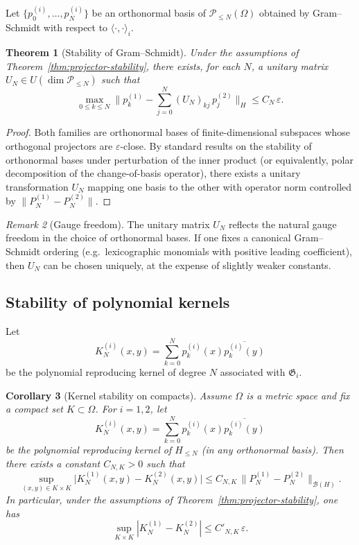 \documentclass{amsart}
\numberwithin{equation}{section}
\newtheorem{theorem}{Theorem}[section]
\newtheorem{corollary}[theorem]{Corollary}
\theoremstyle{definition}
\theoremstyle{remark}
\newtheorem{remark}[theorem]{Remark}
\begin{document}
Let $\{p_0^{(i)},\dots,p_N^{(i)}\}$ be an orthonormal basis of
$\mathcal P_{\le N}(\Omega)$ obtained by Gram--Schmidt with respect to
$\langle\cdot,\cdot \rangle_i$.

\begin{theorem}[Stability of Gram--Schmidt]
\label{thm:GS-stability}
Under the assumptions of Theorem~\ref{thm:projector-stability},
there exists, for each $N$, a unitary matrix $U_N\in U(\dim\mathcal P_{\le N})$
such that
\[
\max_{0\le k\le N}
\big\|
p_k^{(1)}-\sum_{j=0}^N (U_N)_{kj}\,p_j^{(2)}
\big\|_H
\le C_N\,\varepsilon.
\]
\end{theorem}

\begin{proof}
Both families are orthonormal bases of finite-dimensional subspaces
whose orthogonal projectors are $\varepsilon$-close.
By standard results on the stability of orthonormal bases under perturbation
of the inner product (or equivalently, polar decomposition of the change-of-basis
operator), there exists a unitary transformation $U_N$ mapping one basis
to the other with operator norm controlled by $\|P_N^{(1)}-P_N^{(2)}\|$.
\end{proof}

\begin{remark}[Gauge freedom]
The unitary matrix $U_N$ reflects the natural gauge freedom in the choice
of orthonormal bases.
If one fixes a canonical Gram--Schmidt ordering (e.g.\ lexicographic monomials
with positive leading coefficient), then $U_N$ can be chosen uniquely,
at the expense of slightly weaker constants.
\end{remark}

\subsection{Stability of polynomial kernels}

Let
\[
K_N^{(i)}(x,y)
=
\sum_{k=0}^N p_k^{(i)}(x)\overline{p_k^{(i)}(y)}
\]
be the polynomial reproducing kernel of degree $N$ associated with $\mathfrak G_i$.

\begin{corollary}[Kernel stability on compacts]\label{cor:kernel-stability}
Assume $\Omega$ is a metric space and fix a compact set $K\subset\Omega$.
For $i=1,2$, let
\[
K_N^{(i)}(x,y)=\sum_{k=0}^N p_k^{(i)}(x)\overline{p_k^{(i)}(y)}
\]
be the polynomial reproducing kernel of $H_{\le N}$ (in any orthonormal basis).
Then there exists a constant $C_{N,K}>0$ such that
\[
\sup_{(x,y)\in K\times K}\big|K_N^{(1)}(x,y)-K_N^{(2)}(x,y)\big|
\le C_{N,K}\,\|P_N^{(1)}-P_N^{(2)}\|_{\mathcal B(H)}.
\]
In particular, under the assumptions of Theorem~\ref{thm:projector-stability}, one has
\[
\sup_{K\times K}|K_N^{(1)}-K_N^{(2)}|\le C'_{N,K}\,\varepsilon.
\]
\end{corollary}
\end{document}
